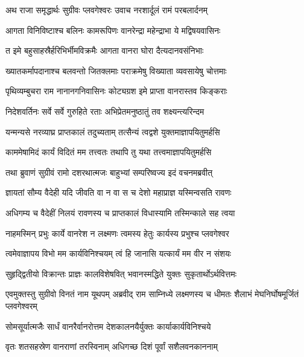 
\twolineshloka
{अथ राजा समृद्धार्थः सुग्रीवः प्लवगेश्वरः}
{उवाच नरशार्दूलं रामं परबलार्दनम्} %

\twolineshloka
{आगता विनिविष्टाश्च बलिनः कामरूपिणः}
{वानरेन्द्रा महेन्द्राभा ये मद्विषयवासिनः} %

\twolineshloka
{त इमे बहुसाहस्रैर्हरिभिर्भीमविक्रमैः}
{आगता वानरा घोरा दैत्यदानवसंनिभाः} %

\twolineshloka
{ख्यातकर्मापदानाश्च बलवन्तो जितक्लमाः}
{पराक्रमेषु विख्याता व्यवसायेषु चोत्तमाः} %

\twolineshloka
{पृथिव्यम्बुचरा राम नानानगनिवासिनः}
{कोट्यग्रश इमे प्राप्ता वानरास्तव किङ्कराः} %

\twolineshloka
{निदेशवर्तिनः सर्वे सर्वे गुरुहिते रताः}
{अभिप्रेतमनुष्ठातुं तव शक्ष्यन्त्यरिन्दम} %

\twolineshloka
{यन्मन्यसे नरव्याघ्र प्राप्तकालं तदुच्यताम्}
{तत्सैन्यं त्वद्वशे युक्तमाज्ञापयितुमर्हसि} %

\twolineshloka
{काममेषामिदं कार्यं विदितं मम तत्त्वतः}
{तथापि तु यथा तत्त्वमाज्ञापयितुमर्हसि} %

\twolineshloka
{तथा ब्रुवाणं सुग्रीवं रामो दशरथात्मजः}
{बाहुभ्यां सम्परिष्वज्य इदं वचनमब्रवीत्} %

\twolineshloka
{ज्ञायतां सौम्य वैदेही यदि जीवति वा न वा}
{स च देशो महाप्राज्ञ यस्मिन्वसति रावणः} %

\twolineshloka
{अधिगम्य च वैदेहीं निलयं रावणस्य च}
{प्राप्तकालं विधास्यामि तस्मिन्काले सह त्वया} %

\twolineshloka
{नाहमस्मिन् प्रभुः कार्ये वानरेश न लक्ष्मणः}
{त्वमस्य हेतुः कार्यस्य प्रभुश्च प्लवगेश्वर} %

\twolineshloka
{त्वमेवाज्ञापय विभो मम कार्यविनिश्चयम्}
{त्वं हि जानासि यत्कार्यं मम वीर न संशयः} %

\twolineshloka
{सुहृद्द्वितीयो विक्रान्तः प्राज्ञः कालविशेषवित्}
{भवानस्मद्धिते युक्तः सुकृतार्थोऽर्थवित्तमः} %

\threelineshloka
{एवमुक्तस्तु सुग्रीवो विनतं नाम यूथपम्}
{अब्रवीद् राम साम्निध्ये लक्ष्मणस्य च धीमतः}
{शैलाभं मेघनिर्घोषमूर्जितं प्लवगेश्वरम्} %

\twolineshloka
{सोमसूर्यात्मजैः सार्धं वानरैर्वानरोत्तम}
{देशकालनयैर्युक्तः कार्याकार्यविनिश्चये} %

\twolineshloka
{वृतः शतसहस्रेण वानराणां तरस्विनाम्}
{अधिगच्छ दिशं पूर्वां सशैलवनकाननाम्} %

